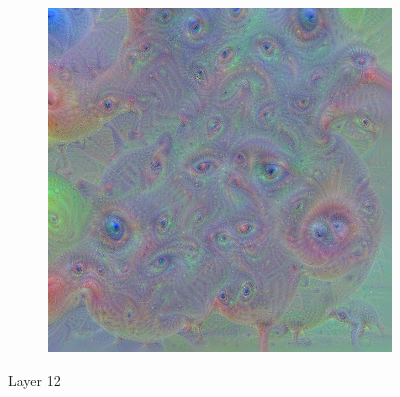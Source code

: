 \begin{figure}
\begin{subfigure}[t]{0.31\textwidth}
        \includegraphics[width=.7\linewidth]{figuras/feat_vis/experiments/final/l12/random_image_pl6_lr1e-1_layer26.png}
        \caption{}
    \end{subfigure}

    \caption{Layer 12}

\end{figure}

